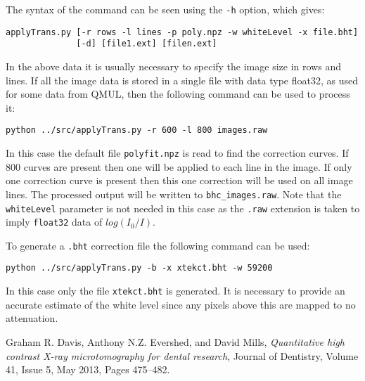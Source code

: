 \documentclass[a4paper]{article}
\begin{document}
The syntax of the command can be seen using the \texttt{-h} option, which gives:
\begin{verbatim}
applyTrans.py [-r rows -l lines -p poly.npz -w whiteLevel -x file.bht]
              [-d] [file1.ext] [filen.ext]
\end{verbatim}
In the above data it is usually necessary to specify the image size in rows and lines.
If all the image data is stored in a single file with data type float32, as used for
some data from QMUL, then the following command can be used to process it:

\begin{verbatim}
python ../src/applyTrans.py -r 600 -l 800 images.raw
\end{verbatim}
In this case the default file \texttt{polyfit.npz} is read to find the correction curves.
If 800 curves are present then one will be applied to each line in the image.
If only one correction curve is present then this one correction will be used on all image lines.
The processed output will be written to \texttt{bhc\_images.raw}.
Note that the \texttt{whiteLevel} parameter is not needed in this case as the \texttt{.raw} extension
is taken to imply \texttt{float32} data of $log(I_0/I)$.

To generate a \texttt{.bht} correction file the following command can be used:
\begin{verbatim}
python ../src/applyTrans.py -b -x xtekct.bht -w 59200
\end{verbatim}
In this case only the file \texttt{xtekct.bht} is generated. It is necessary to provide an accurate estimate
of the white level since any pixels above this are mapped to no attenuation.

\begin{thebibliography}{9}

  Graham R. Davis, Anthony N.Z. Evershed, and David Mills,
  \emph{Quantitative high contrast X-ray microtomography for dental research},
  Journal of Dentistry,
  Volume 41, Issue 5, May 2013, Pages 475–482.

\end{thebibliography}
\end{document}
